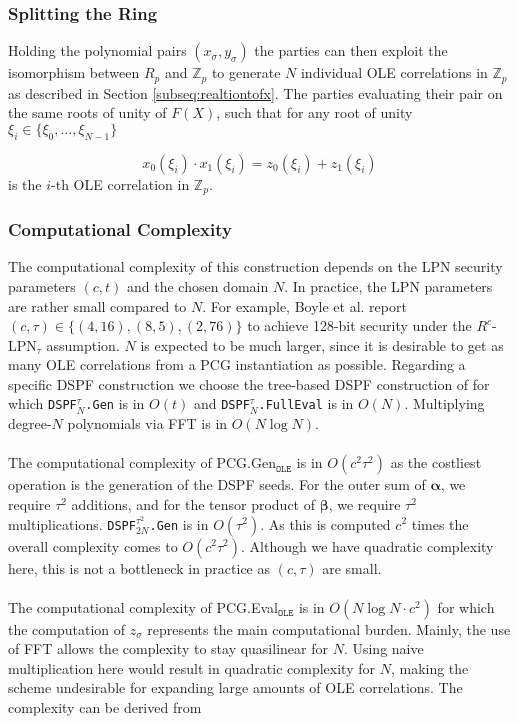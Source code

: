 \subsubsection{Splitting the Ring}

Holding the polynomial pairs $(x_\sigma , y_\sigma)$ the parties can then exploit the isomorphism between $R_p$ and $\mathbb{Z}_{p}$ to generate $N$ individual OLE correlations in $\mathbb{Z}_{p}$ as described in Section \ref{subseq:realtiontofx}. The parties evaluating their pair on the same roots of unity of $F(X)$, such that for any root of unity $\xi_i \in \{\xi_0, ...,\xi_{N-1}\}$

\begin{equation}
x_0(\xi_i) \cdot x_1(\xi_i) = z_0(\xi_i)+ z_1(\xi_i)
\end{equation}
is the $i$-th OLE correlation in $\mathbb{Z}_{p}$.

\subsubsection{Computational Complexity}
The computational complexity of this construction depends on the LPN security parameters $(c, t)$ and the chosen domain $N$. In practice, the LPN parameters are rather small compared to $N$. For example, Boyle et al. \cite{boyle2020efficient} report $(c,\tau) \in \{(4,16),(8,5),(2,76)\}$ to achieve 128-bit security under the $R^c$-LPN$_\tau$ assumption. $N$ is expected to be much larger, since it is desirable to get as many OLE correlations from a PCG instantiation as possible. Regarding a specific DSPF construction we choose the tree-based DSPF construction of \cite{boyle2016function} for which \texttt{DSPF$^{\tau}_{N}$.Gen} is in $O(t)$ and \texttt{DSPF$^{\tau}_{N}$.FullEval} is in $O(N)$. Multiplying degree-$N$ polynomials via FFT is in $O(N\log N)$.
\\\\
The computational complexity of PCG.Gen$_{\texttt{OLE}}$ is in $O(c^2\tau^2)$ as the costliest operation is the generation of the DSPF seeds. For the outer sum of $\boldsymbol{\alpha}$, we require $\tau^2$ additions, and for the tensor product of $\boldsymbol{\beta}$, we require $\tau^2$ multiplications. \texttt{DSPF$^{\tau^2}_{2N}$.Gen} is in $O(\tau^2)$. As this is computed $c^2$ times the overall complexity comes to $O(c^2\tau^2)$. Although we have quadratic complexity here, this is not a bottleneck in practice as $(c,\tau)$ are small.
\\\\
The computational complexity of PCG.Eval$_{\texttt{OLE}}$ is in $O(N\log N \cdot c^2)$ for which the computation of $z_\sigma$ represents the main computational burden. Mainly, the use of FFT allows the complexity to stay quasilinear for $N$. Using naive multiplication here would result in quadratic complexity for $N$, making the scheme undesirable for expanding large amounts of OLE correlations. The complexity can be derived from

